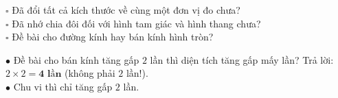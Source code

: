 \documentclass[14pt,a4paper,oneside]{extbook}
\begin{document}
\noindent
\begin{minipage}[t]{0.54\textwidth}
  \begin{tcolorbox}[
    enhanced,
    title={\footnotesize\bfseries\color{white}\faCheck\ Checklist 3 bước trước khi đặt bút tính},
    colback=green!3!white,
    colframe=green!60!black,
    arc=2.5mm, boxrule=0.8pt, top=1.8mm, bottom=1.8mm, left=2.2mm, right=2.2mm
  ]
    \footnotesize
    $\square$ Đã đổi tất cả kích thước về cùng một đơn vị đo chưa?\\
    $\square$ Đã nhớ chia đôi đối với hình tam giác và hình thang chưa?\\
    $\square$ Đề bài cho đường kính hay bán kính hình tròn?
  \end{tcolorbox}
\end{minipage}%
\hfill
\begin{minipage}[t]{0.44\textwidth}
  \begin{tcolorbox}[
    enhanced,
    title={\footnotesize\bfseries\color{white}\faExclamationTriangle\ Mẹo tránh bẫy trắc nghiệm},
    colback=red!2!white,
    colframe=red!70!black,
    arc=2.5mm, boxrule=0.8pt, top=1.8mm, bottom=1.8mm, left=2.2mm, right=2.2mm
  ]
    \footnotesize
    $\bullet$ Đề bài cho bán kính tăng gấp $2$ lần thì diện tích tăng gấp mấy lần? Trả lời: $2 \times 2 = \mathbf{4\text{ lần}}$ (không phải $2$ lần!).\\
    $\bullet$ Chu vi thì chỉ tăng gấp $2$ lần.
  \end{tcolorbox}
\end{minipage}
\end{document}
